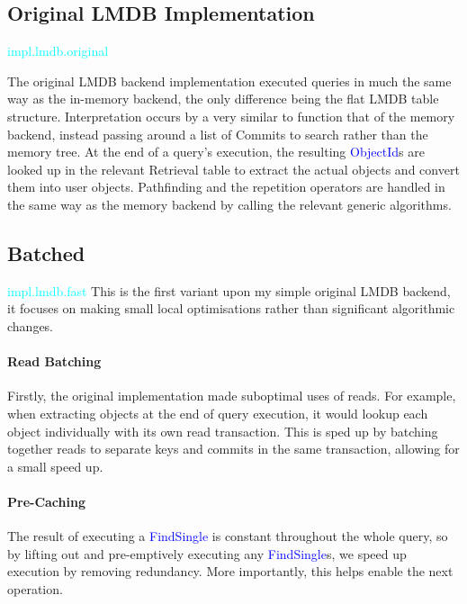 \documentclass[12pt,a4paper,twoside,openright]{report}
\newcommand\codeName[1]{\textcolor{blue}{#1}}
\newcommand\note[1]{\textcolor{cyan}{#1}}
\begin{document}
{{	\subsection{Original LMDB Implementation}
	\note{impl.lmdb.original}

The original LMDB backend implementation executed queries in much the same way as the in-memory backend, the only difference being the flat LMDB table structure. Interpretation occurs by a very similar to function that of the memory backend, instead passing around a list of Commits to search rather than the memory tree. At the end of a query's execution, the resulting \codeName{ObjectId}s are looked up in the relevant Retrieval table to extract the actual objects and convert them into user objects. Pathfinding and the repetition operators are handled in the same way as the memory backend by calling the relevant generic algorithms.
 

	\subsection{Batched}
	\note{impl.lmdb.fast}
	This is the first variant upon my simple original LMDB backend, it focuses on making small local optimisations rather than significant algorithmic changes.
	
		\paragraph{Read Batching}
		Firstly, the original implementation made suboptimal uses of reads. For example, when extracting objects at the end of query execution, it would lookup each object individually with its own read transaction. This is sped up by batching together reads to separate keys and commits in the same transaction, allowing for a small speed up.
		
		\paragraph{Pre-Caching}
		The result of executing a \codeName{FindSingle} is constant throughout the whole query, so by lifting out and pre-emptively executing any \codeName{FindSingle}s, we speed up execution by removing redundancy. More importantly, this helps enable the next operation.
		
}}
\end{document}
